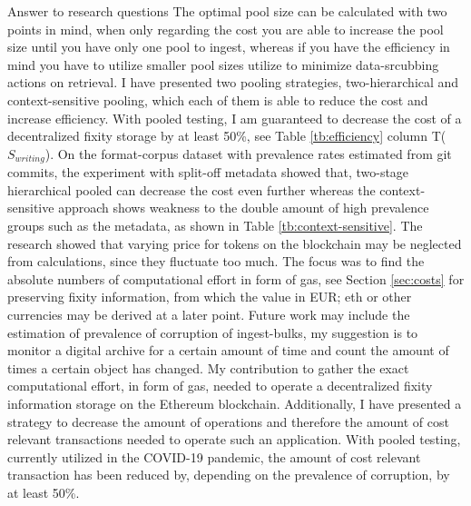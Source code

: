 Answer to research questions
The optimal pool size can be calculated with two points in mind, when only regarding the cost you are able to increase the pool size until you have only one pool to ingest, whereas if you have the efficiency in mind you have to utilize smaller pool sizes utilize to minimize data-srcubbing actions on retrieval. I have presented two pooling strategies, two-hierarchical and context-sensitive pooling, which each of them is able to reduce the cost and increase efficiency. With pooled testing, I am guaranteed to decrease the cost of a decentralized fixity storage by at least 50\%, see Table \ref{tb:efficiency} column T($S_{writing}$). On the format-corpus dataset with prevalence rates estimated from git commits, the experiment with split-off metadata showed that, two-stage hierarchical pooled can decrease the cost even further whereas the context-sensitive approach shows weakness to the double amount of high prevalence groups such as the metadata, as shown in Table \ref{tb:context-sensitive}.
The research showed that varying price for tokens on the blockchain may be neglected from calculations, since they fluctuate too much. The focus was to find the absolute numbers of computational effort in form of gas, see Section \ref{sec:costs} for preserving fixity information, from which the value in EUR; \acrshort{eth} or other currencies may be derived at a later point. 
Future work may include the estimation of prevalence of corruption of ingest-bulks, my suggestion is to monitor a digital archive for a certain amount of time and count the amount of times a certain object has changed. 
My contribution to gather the exact computational effort, in form of gas, needed to operate a decentralized fixity information storage on the Ethereum blockchain. Additionally, I have presented a strategy to decrease the amount of operations and therefore the amount of cost relevant transactions needed to operate such an application. With pooled testing, currently utilized in the COVID-19 pandemic, the amount of cost relevant \gls{transaction} has been reduced by, depending on the prevalence of corruption, by at least 50\%.